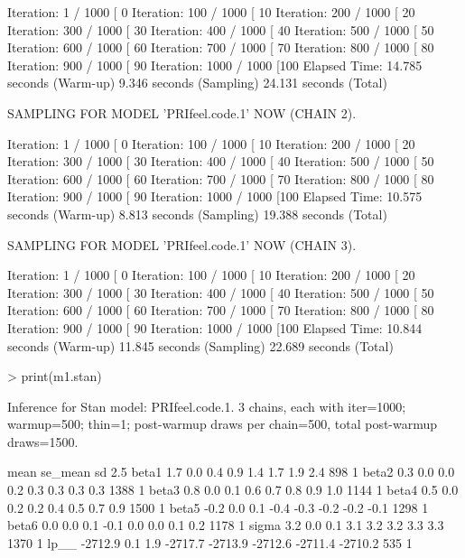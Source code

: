 \documentclass[12pt]{article}
\begin{document}
\begin{enumerate}
\begin{Schunk}
\begin{Soutput}
Iteration:   1 / 1000 [  0%
Iteration: 100 / 1000 [ 10%
Iteration: 200 / 1000 [ 20%
Iteration: 300 / 1000 [ 30%
Iteration: 400 / 1000 [ 40%
Iteration: 500 / 1000 [ 50%
Iteration: 600 / 1000 [ 60%
Iteration: 700 / 1000 [ 70%
Iteration: 800 / 1000 [ 80%
Iteration: 900 / 1000 [ 90%
Iteration: 1000 / 1000 [100%
Elapsed Time: 14.785 seconds (Warm-up)
              9.346 seconds (Sampling)
              24.131 seconds (Total)

SAMPLING FOR MODEL 'PRIfeel.code.1' NOW (CHAIN 2).

Iteration:   1 / 1000 [  0%
Iteration: 100 / 1000 [ 10%
Iteration: 200 / 1000 [ 20%
Iteration: 300 / 1000 [ 30%
Iteration: 400 / 1000 [ 40%
Iteration: 500 / 1000 [ 50%
Iteration: 600 / 1000 [ 60%
Iteration: 700 / 1000 [ 70%
Iteration: 800 / 1000 [ 80%
Iteration: 900 / 1000 [ 90%
Iteration: 1000 / 1000 [100%
Elapsed Time: 10.575 seconds (Warm-up)
              8.813 seconds (Sampling)
              19.388 seconds (Total)

SAMPLING FOR MODEL 'PRIfeel.code.1' NOW (CHAIN 3).

Iteration:   1 / 1000 [  0%
Iteration: 100 / 1000 [ 10%
Iteration: 200 / 1000 [ 20%
Iteration: 300 / 1000 [ 30%
Iteration: 400 / 1000 [ 40%
Iteration: 500 / 1000 [ 50%
Iteration: 600 / 1000 [ 60%
Iteration: 700 / 1000 [ 70%
Iteration: 800 / 1000 [ 80%
Iteration: 900 / 1000 [ 90%
Iteration: 1000 / 1000 [100%
Elapsed Time: 10.844 seconds (Warm-up)
              11.845 seconds (Sampling)
              22.689 seconds (Total)
\end{Soutput}
\begin{Sinput}
> print(m1.stan)
\end{Sinput}
\begin{Soutput}
Inference for Stan model: PRIfeel.code.1.
3 chains, each with iter=1000; warmup=500; thin=1; 
post-warmup draws per chain=500, total post-warmup draws=1500.

         mean se_mean  sd    2.5%
beta1     1.7     0.0 0.4     0.9     1.4     1.7     1.9     2.4   898    1
beta2     0.3     0.0 0.0     0.2     0.3     0.3     0.3     0.3  1388    1
beta3     0.8     0.0 0.1     0.6     0.7     0.8     0.9     1.0  1144    1
beta4     0.5     0.0 0.2     0.2     0.4     0.5     0.7     0.9  1500    1
beta5    -0.2     0.0 0.1    -0.4    -0.3    -0.2    -0.2    -0.1  1298    1
beta6     0.0     0.0 0.1    -0.1     0.0     0.0     0.1     0.2  1178    1
sigma     3.2     0.0 0.1     3.1     3.2     3.2     3.3     3.3  1370    1
lp__  -2712.9     0.1 1.9 -2717.7 -2713.9 -2712.6 -2711.4 -2710.2   535    1


\end{Soutput}
\end{Schunk}
\end{enumerate}
\end{document}
